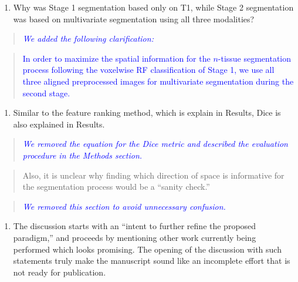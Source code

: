 \documentclass[12pt,]{article}
\providecommand{\tightlist}{%
  \setlength{\itemsep}{0pt}\setlength{\parskip}{0pt}}
\begin{document}
\begin{enumerate}
\def\labelenumi{\arabic{enumi}.}
\setcounter{enumi}{11}
\tightlist
\item
  Why was Stage 1 segmentation based only on T1, while Stage 2
  segmentation was based on multivariate segmentation using all three
  modalities?
\end{enumerate}

\begin{quote}
\emph{\textcolor{blue}{We added the following clarification:}}
\end{quote}

\begin{quote}
\textcolor{blue}{In order to maximize the spatial information for the $n$-tissue segmentation
process following the voxelwise RF classification of Stage 1, we use all three
aligned preprocessed images for multivariate segmentation during the second stage.}
\end{quote}

\begin{enumerate}
\def\labelenumi{\arabic{enumi}.}
\setcounter{enumi}{12}
\tightlist
\item
  Similar to the feature ranking method, which is explain in Results,
  Dice is also explained in Results.
\end{enumerate}

\begin{quote}
\emph{\textcolor{blue}{We removed the equation for the Dice metric and described the
evaluation procedure in the Methods section.}}
\end{quote}

\begin{quote}
Also, it is unclear why finding which direction of space is informative
for the segmentation process would be a ``sanity check.''
\end{quote}

\begin{quote}
\emph{\textcolor{blue}{We removed this section to avoid unnecessary confusion.}}
\end{quote}

\begin{enumerate}
\def\labelenumi{\arabic{enumi}.}
\setcounter{enumi}{13}
\tightlist
\item
  The discussion starts with an ``intent to further refine the proposed
  paradigm,'' and proceeds by mentioning other work currently being
  performed which looks promising. The opening of the discussion with
  such statements truly make the manuscript sound like an incomplete
  effort that is not ready for publication.
\end{enumerate}
\end{document}
